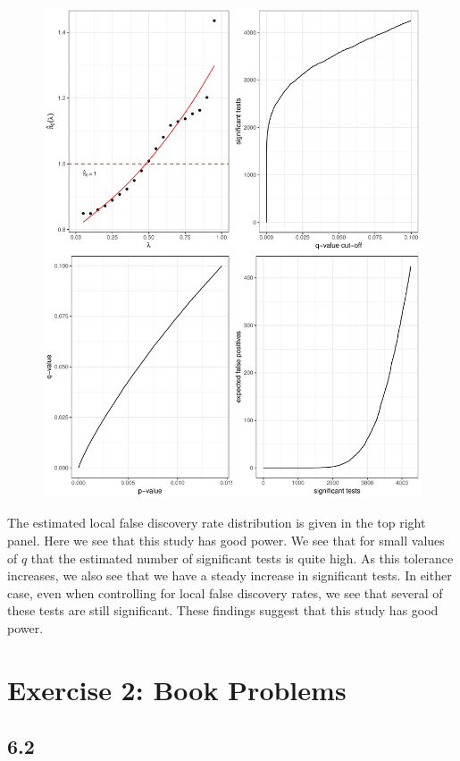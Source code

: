\documentclass[11pt]{article}
\begin{document}
\begin{figure}[h!]
	\centering
	\includegraphics[scale = 0.25]{figures/q-value.pdf}
\end{figure}
The estimated local false discovery rate distribution is given in the top right panel. Here we see that this study has good power. We see that for small values of $q$ that the estimated number of significant tests is quite high. As this tolerance increases, we also see that we have a steady increase in significant tests. In either case, even when controlling for local false discovery rates, we see that several of these tests are still significant. These findings suggest that this study has good power. 



\section{Exercise 2: Book Problems}

\subsection{6.2}
\end{document}
